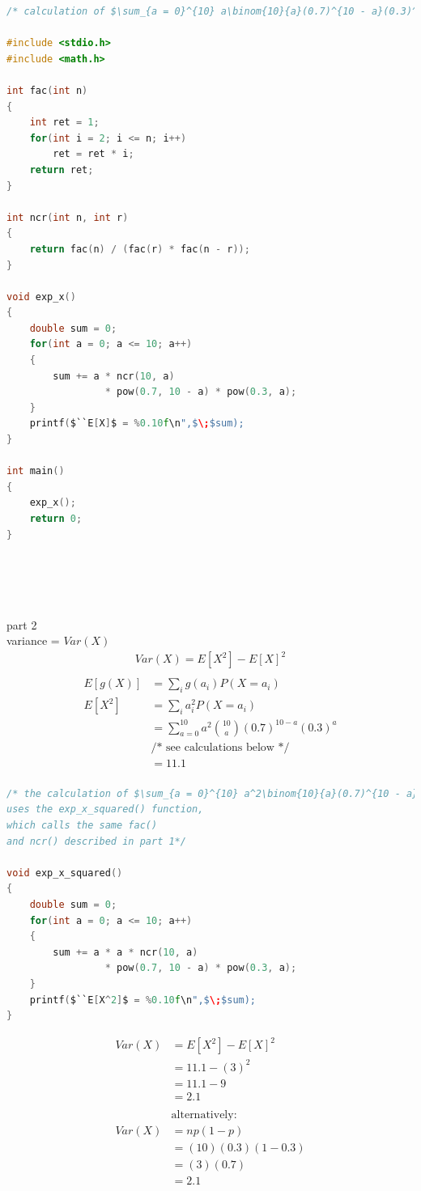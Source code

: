 \documentclass[12pt,border=4pt,multi]{article}%
\begin{document}
\begin{lstlisting}[language = c, mathescape = true]
/* calculation of $\sum_{a = 0}^{10} a\binom{10}{a}(0.7)^{10 - a}(0.3)^a$ */

#include <stdio.h>
#include <math.h>

int fac(int n)
{
    int ret = 1;
    for(int i = 2; i <= n; i++)
        ret = ret * i;
    return ret;
}

int ncr(int n, int r)
{
    return fac(n) / (fac(r) * fac(n - r));
}

void exp_x()
{
    double sum = 0;
    for(int a = 0; a <= 10; a++)
    {
        sum += a * ncr(10, a)
                 * pow(0.7, 10 - a) * pow(0.3, a);
    }
    printf($``E[X]$ = %0.10f\n",$\;$sum);
}

int main()
{
    exp_x();
    return 0;
}
\end{lstlisting}
\leavevmode\\
\\
\\
\\
part 2\\
variance = $Var(X)$
\begin{align*}
Var(X) = E[X^2] - E[X]^2\\
\end{align*}
\begin{align*}
E[g(X)] &= \sum_i g(a_i) P(X = a_i)\\
E[X^2] &= \sum_i a_i^2 P(X = a_i)\\
&= \sum_{a = 0}^{10} a^2\binom{10}{a}(0.7)^{10 - a}(0.3)^a\\
&\text{/* see calculations below */}\\
&= 11.1\\
\end{align*}
\begin{lstlisting}[language = c, mathescape = true]
/* the calculation of $\sum_{a = 0}^{10} a^2\binom{10}{a}(0.7)^{10 - a}(0.3)^a$ 
uses the exp_x_squared() function, 
which calls the same fac() 
and ncr() described in part 1*/

void exp_x_squared()
{
    double sum = 0;
    for(int a = 0; a <= 10; a++)
    {
        sum += a * a * ncr(10, a)
                 * pow(0.7, 10 - a) * pow(0.3, a);
    }
    printf($``E[X^2]$ = %0.10f\n",$\;$sum);
}
\end{lstlisting}
\begin{align*}
Var(X) &= E[X^2] - E[X]^2\\
&= 11.1 - (3)^2\\
&= 11.1 - 9\\
&= \boxed{2.1}\\
\\
&\text{alternatively:}\\
Var(X) &= np(1 - p)\\
&= (10)(0.3)(1 - 0.3)\\
&= (3)(0.7)\\
&= \boxed{2.1}\\
\end{align*}
\end{document}
